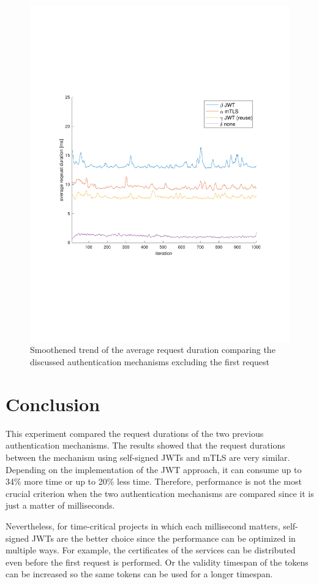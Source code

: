 \begin{figure}
	\centering
	\includegraphics[trim=0 200 0 200, clip, width=\textwidth]{images/experiment/experiment-trend.pdf}
	\caption{Smoothened trend of the average request duration comparing the discussed authentication mechanisms excluding the first request}
	\label{fig:trend}
\end{figure}

\section{Conclusion}
This experiment compared the request durations of the two previous authentication mechanisms.
The results showed that the request durations between the mechanism using self-signed JWTs and mTLS are very similar.
Depending on the implementation of the JWT approach, it can consume up to 34\% more time or up to 20\% less time.
Therefore, performance is not the most crucial criterion when the two authentication mechanisms are compared since it is just a matter of milliseconds. 

Nevertheless, for time-critical projects in which each millisecond matters, self-signed JWTs are the better choice since the performance can be optimized in multiple ways.
For example, the certificates of the services can be distributed even before the first request is performed.
Or the validity timespan of the tokens can be increased so the same tokens can be used for a longer timespan.
